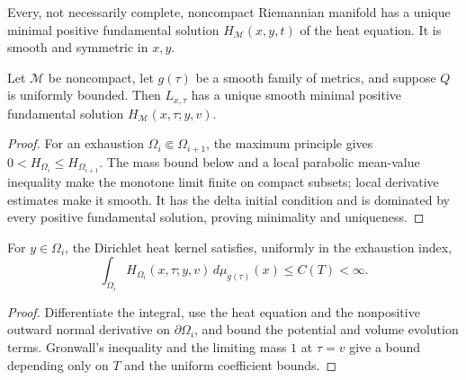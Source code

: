 \begin{theorem}
\label{thm:chow-iii-noncompact-static-heat-kernel}
Every, not necessarily complete, noncompact Riemannian manifold has a unique
minimal positive fundamental solution \(H_{\mathcal M}(x,y,t)\) of the heat
equation.  It is smooth and symmetric in \(x,y\).
\end{theorem}

\begin{theorem}
\label{thm:chow-iii-noncompact-evolving-heat-kernel}
Let \(\mathcal M\) be noncompact, let \(g(\tau)\) be a smooth family of
metrics, and suppose \(Q\) is uniformly bounded.  Then \(L_{x,\tau}\) has a
unique smooth minimal positive fundamental solution
\(H_{\mathcal M}(x,\tau;y,v)\).
\end{theorem}
\begin{proof}
\sketch For an exhaustion \(\Omega_i\Subset\Omega_{i+1}\), the maximum principle gives
\(0<H_{\Omega_i}\le H_{\Omega_{i+1}}\).  The mass bound below and a local
parabolic mean-value inequality make the monotone limit finite on compact
subsets; local derivative estimates make it smooth.  It has the delta initial
condition and is dominated by every positive fundamental solution, proving
minimality and uniqueness.
\end{proof}

\begin{lemma}
\label{lem:chow-iii-dirichlet-kernel-mass-bound}
For \(y\in\Omega_i\), the Dirichlet heat kernel satisfies, uniformly in the
exhaustion index,
\[
 \int_{\Omega_i}H_{\Omega_i}(x,\tau;y,v)
 \,d\mu_{g(\tau)}(x)\le C(T)<\infty.
\]
\end{lemma}
\begin{proof}
\sketch Differentiate the integral, use the heat equation and the nonpositive outward
normal derivative on \(\partial\Omega_i\), and bound the potential and volume
evolution terms.  Gronwall's inequality and the limiting mass \(1\) at
\(\tau=v\) give a bound depending only on \(T\) and the uniform coefficient
bounds.
\end{proof}
